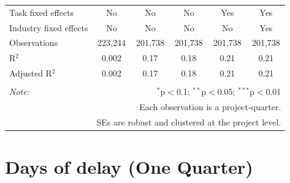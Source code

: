 \documentclass[
]{article}
\begin{document}
\begin{table}[H]
\begin{tabular}{@{\extracolsep{-2pt}}lccccc}
Task fixed effects & No & No & No & Yes & Yes \\ 
Industry fixed effects & No & No & No & No & Yes \\ 
Observations & 223,244 & 201,738 & 201,738 & 201,738 & 201,738 \\ 
R$^{2}$ & 0.002 & 0.17 & 0.18 & 0.21 & 0.21 \\ 
Adjusted R$^{2}$ & 0.002 & 0.17 & 0.18 & 0.21 & 0.21 \\ 
\hline 
\hline \\[-1.8ex] 
\textit{Note:}  & \multicolumn{5}{r}{$^{*}$p$<$0.1; $^{**}$p$<$0.05; $^{***}$p$<$0.01} \\ 
 & \multicolumn{5}{r}{Each observation is a project-quarter.} \\ 
 & \multicolumn{5}{r}{SEs are robust and clustered at the project level.} \\ 
\end{tabular} 
\end{table}

\hypertarget{days-of-delay-one-quarter}{%
\section{Days of delay (One Quarter)}\label{days-of-delay-one-quarter}}
\end{document}
